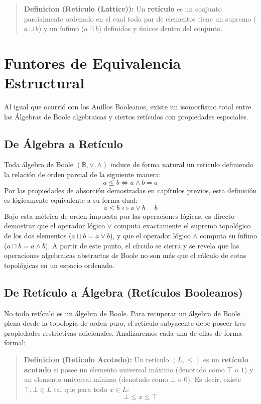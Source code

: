 \begin{quote}\textbf{Definicion (Retículo (Lattice)):}\label{reticulo}
Un \textbf{retículo} es un conjunto parcialmente ordenado en el cual todo par de elementos tiene un supremo ($a \sqcup b$) y un ínfimo ($a \sqcap b$) definidos y únicos dentro del conjunto.
\end{quote}

\section{Funtores de Equivalencia Estructural}

Al igual que ocurrió con los Anillos Booleanos, existe un isomorfismo total entre las Álgebras de Boole algebraicas y ciertos retículos con propiedades especiales.

\subsection{De Álgebra a Retículo}
Toda álgebra de Boole $(\mathbb{B}, \vee, \wedge)$ induce de forma natural un retículo definiendo la relación de orden parcial de la siguiente manera:
\[ a \le b \iff a \wedge b = a \]
Por las propiedades de absorción demostradas en capítulos previos, esta definición es lógicamente equivalente a su forma dual:
\[ a \le b \iff a \vee b = b \]
Bajo esta métrica de orden impuesta por las operaciones lógicas, es directo demostrar que el operador lógico $\vee$ computa exactamente el supremo topológico de los dos elementos ($a \sqcup b = a \vee b$), y que el operador lógico $\wedge$ computa su ínfimo ($a \sqcap b = a \wedge b$). A partir de este punto, el círculo se cierra y se revela que las operaciones algebraicas abstractas de Boole no son más que el cálculo de cotas topológicas en un espacio ordenado.

\subsection{De Retículo a Álgebra (Retículos Booleanos)}
No todo retículo es un álgebra de Boole. Para recuperar un álgebra de Boole plena desde la topología de orden puro, el retículo subyacente debe poseer tres propiedades restrictivas adicionales. Analizaremos cada una de ellas de forma formal:

\begin{quote}\textbf{Definicion (Retículo Acotado):}\label{reticulo_acotado}
Un retículo $(L, \le)$ es un \textbf{retículo acotado} si posee un elemento universal máximo (denotado como $\top$ o $1$) y un elemento universal mínimo (denotado como $\bot$ o $0$). Es decir, existe $\top, \bot \in L$ tal que para todo $x \in L:$
\[ \bot \le x \le \top \]
\end{quote}

